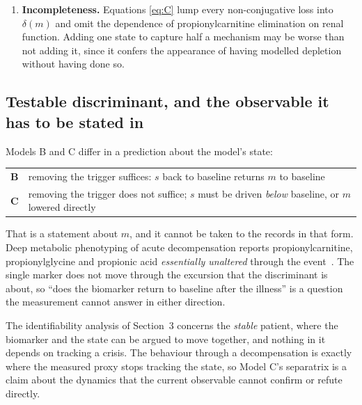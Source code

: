 \begin{enumerate}[leftmargin=*, itemsep=2pt]
      solubilised from \emph{rat} renal brush-border membrane and reconstituted into
      liposomes, and its identification with OCTN2 is the authors' own qualified
      one~\cite{octn2_renal_transport}. %
      No measurement in patients establishes that the recovered fraction of filtered
      carnitine falls with the metabolite. What patients supply is the direction of absolute
      excretion, which the model matches, and that is the weaker test.
\item \textbf{Incompleteness.} Equations \eqref{eq:C} lump every non-conjugative loss into
      $\delta(m)$ and omit the dependence of propionylcarnitine elimination on renal
      function. Adding one state to capture half a mechanism may be worse than not adding
      it, since it confers the appearance of having modelled depletion without having done
      so.
\end{enumerate}

\subsection{Testable discriminant, and the observable it has to be stated in}
\label{sec:discriminant}

Models B and C differ in a prediction about the model's state:

\begin{center}
\begin{tabular}{@{}ll@{}}
\toprule
\textbf{B} & removing the trigger suffices: $s$ back to baseline returns $m$ to baseline \\
\textbf{C} & removing the trigger does not suffice; $s$ must be driven \emph{below} baseline,
             or $m$ lowered directly \\
\bottomrule
\end{tabular}
\end{center}

That is a statement about $m$, and it cannot be taken to the records in that form. Deep
metabolic phenotyping of acute decompensation reports propionylcarnitine, propionylglycine
and propionic acid \emph{essentially unaltered} through the event~\cite{amd_phenotyping}. %
The single marker does not move through the excursion that the discriminant is about, so
``does the biomarker return to baseline after the illness'' is a question the measurement
cannot answer in either direction.

\begin{remark}[Scope]
\label{rem:scope}
The identifiability analysis of Section~3 concerns the \emph{stable} patient, where the
biomarker and the state can be argued to move together, and nothing in it depends on
tracking a crisis. The behaviour through a decompensation is exactly where the measured
proxy stops tracking the state, so Model C's separatrix is a claim about the dynamics that
the current observable cannot confirm or refute directly.
\end{remark}

